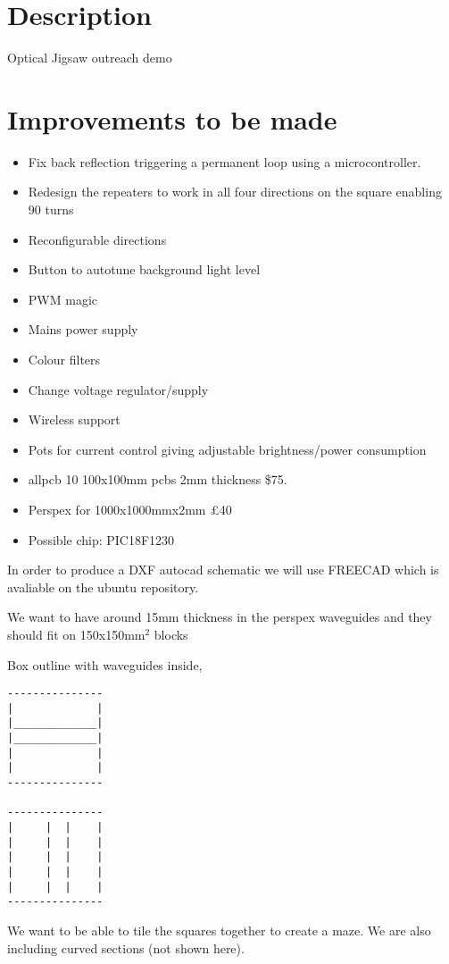 \documentclass[12pt]{article}
\begin{document}
\section{Description}

Optical Jigsaw outreach demo




\section{Improvements to be made}

\begin{itemize}
	\item Fix back reflection triggering a permanent loop using a microcontroller.
	\item Redesign the repeaters to work in all four directions on the square enabling 90 \degree turns 
	\item Reconfigurable directions
	\item Button to autotune background light level
	\item PWM magic
	\item Mains power supply 
	\item Colour filters
	\item Change voltage regulator/supply
	\item Wireless support
	\item Pots for current control giving adjustable brightness/power consumption	
\end{itemize}

\begin{itemize}
	\item allpcb 10 100x100mm pcbs 2mm thickness \$75.
	\item Perspex for 1000x1000mmx2mm £40
        \item Possible chip: PIC18F1230
\end{itemize}

In order to produce a DXF autocad schematic we will use FREECAD which is avaliable on the ubuntu repository.

We want to have around 15mm thickness in the perspex waveguides and they should fit on 150x150mm$^2$ blocks

Box outline with waveguides inside, 
\begin{verbatim}
---------------
|             |
|_____________|
|_____________| 
|             |
|             |
---------------

---------------
|     |  |    |
|     |  |    |
|     |  |    | 
|     |  |    |
|     |  |    |
---------------

\end{verbatim}


We want to be able to tile the squares together to create a maze. We are also including curved sections (not shown here).
\end{document}
